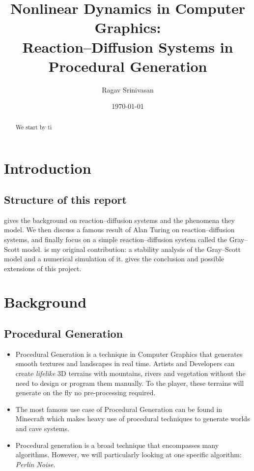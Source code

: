 \documentclass[a4paper, 11pt]{article}
\title{Nonlinear Dynamics in Computer Graphics:\\
       Reaction--Diffusion Systems in Procedural Generation}
\author{Ragav Srinivasan}
\date{\today}
\begin{document}
\maketitle

\begin{abstract}
	We start by ti
\end{abstract}

\section{Introduction}
\label{sec:introduction}
\subsection{Structure of this report}
 gives the background on reaction--diffusion systems and the phenomena they
model. We then discuss a famous result of Alan Turing on reaction--diffusion systems, and finally
focus on a simple reaction--diffusion system called the Gray--Scott model.
 is my original contribution: a stability analysis of the Gray--Scott model
and a numerical simulation of it.
 gives the conclusion and possible extensions of this project.
\section{Background}
\label{sec:background}



\subsection{Procedural Generation}
\label{sec:procedural}

\begin{itemize}
	\item Procedural Generation is a technique in Computer Graphics that generates smooth textures and landscapes in real time. Artists and Developers can create \emph{lifelike} 3D terrains with mountains, rivers and vegetation without the need to design or program them manually. To the player, these terrains will generate on the fly no pre-processing required.
	\item The most famous use case of Procedural Generation can be found in Minecraft which makes heavy use of procedural techniques to generate worlds and cave systems.
	\item Procedural generation is a broad technique that encompasses many algorithms. However, we will particularly looking at one specific algorithm: \emph{Perlin Noise}.
\end{itemize}
\end{document}
